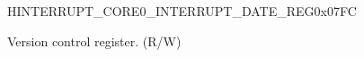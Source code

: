 \begin{register}{H}{INTERRUPT\_CORE0\_INTERRUPT\_DATE\_REG}{0x07FC}\label{regdesc:INTERRUPTCORE0INTERRUPTDATEREG}
%
%
\regnewline%
\begin{regdesc}\begin{reglist}
\label{fielddesc:INTERRUPTCORE0INTERRUPTDATE}\item [INTERRUPT\_CORE0\_INTERRUPT\_DATE] Version control register. (R/W)
\end{reglist}\end{regdesc}
\end{register}
